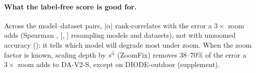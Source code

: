 \paragraph{What the label-free score is good for.}
Across the \proxyPairs{} model--dataset pairs, $|\alpha|$ rank-correlates with the error a $3\times$ zoom adds
(Spearman \proxyRhoDeltaThreeTwoWay, [\proxyRhoDeltaThreeTwoWayLo, \proxyRhoDeltaThreeTwoWayHi] resampling models
and datasets), not with unzoomed accuracy (\proxyRhoOne): it tells which model will degrade most under zoom.
When the zoom factor is known, scaling depth by $s^{\hat\alpha}$ (ZoomFix) removes 38--70\% of the error a
$3\times$ zoom adds to DA-V2-S, except on DIODE-outdoor (supplement).

